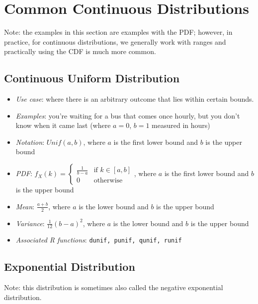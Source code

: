 \documentclass[12pt]{article}
\begin{document}
\section{Common Continuous Distributions}

Note: the examples in this section are examples with the PDF; however, in
practice, for continuous distributions, we generally work with ranges and
practically using the CDF is much more common.

\subsection{Continuous Uniform Distribution}

\begin{itemize}
	\item \textit{Use case}: where there is an arbitrary outcome that lies within certain bounds.
	\item \textit{Examples}: you're waiting for a bus that comes once hourly,
	      but you don't know when it came last (where $a = 0$, $b = 1$ measured
	      in hours)
	\item \textit{Notation}: $Unif(a, b)$, where $a$ is the first lower bound and $b$ is the upper bound
	\item \textit{PDF}: $f_X(k) = \begin{cases}
			      \frac{1}{b-a} & \text{if } k \in [a, b] \\
			      0             & \text{otherwise}
		      \end{cases}$, where $a$ is the first lower bound and $b$ is the upper bound
	\item \textit{Mean}: $\frac{a + b}{2}$, where $a$ is the lower bound and $b$ is the upper bound
	\item \textit{Variance}: $\frac{1}{12}(b-a)^2$, where $a$ is the lower bound and $b$ is the upper bound
	\item \textit{Associated R functions}: \verb|dunif, punif, qunif, runif|
\end{itemize}

\subsection{Exponential Distribution}
Note: this distribution is sometimes also called the negative exponential
distribution.
\end{document}
